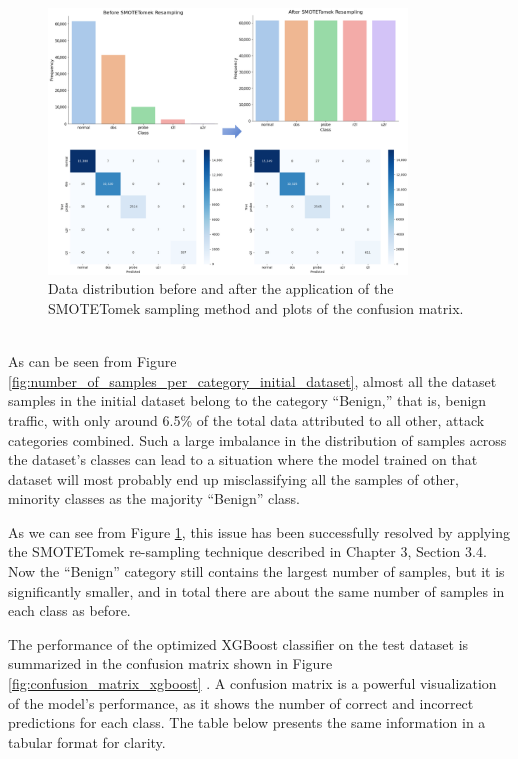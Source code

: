 \begin{figure}[H]
	\centering
	\includegraphics[width=0.85\textwidth]{assets/figures/smotetomek.png}
	\caption{Data distribution before and after the application of the SMOTETomek sampling method and plots of the confusion matrix. }
	\label{fig:number_of_samples_per_category_post_smotetomekt}
\end{figure}
\parencite{zhang2025sedwnet}\\

As can be seen from Figure \ref{fig:number_of_samples_per_category_initial_dataset}, almost all the dataset samples in the initial dataset belong to the category “Benign,” that is, benign traffic, with only around 6.5\% of the total data attributed to all other, attack categories combined. Such a large imbalance in the distribution of samples across the dataset’s classes can lead to a situation where the model trained on that dataset will most probably end up misclassifying all the samples of other, minority classes as the majority “Benign” class.

As we can see from Figure \ref{fig:number_of_samples_per_category_post_smotetomekt}, this issue has been successfully resolved by applying the SMOTETomek re-sampling technique described in Chapter 3, Section 3.4. Now the “Benign” category still contains the largest number of samples, but it is significantly smaller, and in total there are about the same number of samples in each class as before.

The performance of the optimized XGBoost classifier on the test dataset is summarized in the confusion matrix shown in Figure \ref{fig:confusion_matrix_xgboost} . A confusion matrix is a powerful visualization of the model's performance, as it shows the number of correct and incorrect predictions for each class. The table below presents the same information in a tabular format for clarity.


